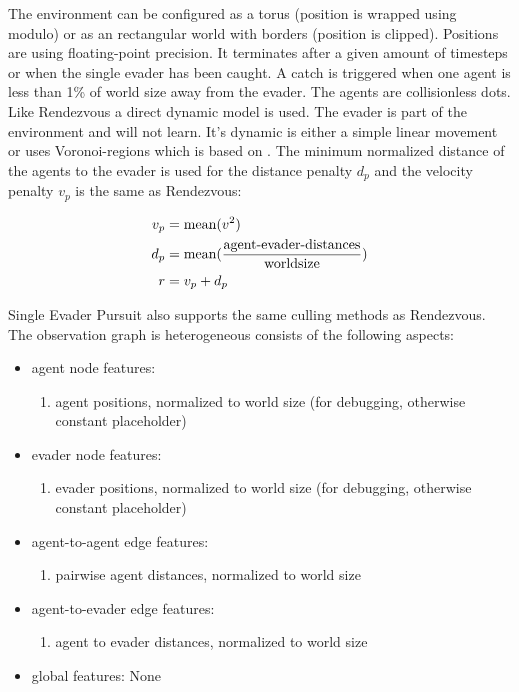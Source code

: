 The environment can be configured as a torus (position is wrapped using modulo) or as an rectangular world with borders (position is clipped). Positions are using floating-point precision. It terminates after a given amount of timesteps or when the single evader has been caught. A catch is triggered when one agent is less than 1\% of world size away from the evader.
The agents are collisionless dots. Like Rendezvous a direct dynamic model is used. The evader is part of the environment and will not learn. It's dynamic is either a simple linear movement or uses Voronoi-regions which is based on \citet{ZHOU201664}.
The minimum normalized distance of the agents to the evader is used for the distance penalty $d_p$ and the velocity penalty $v_p$ is the same as Rendezvous:

\begin{equation}
    \begin{aligned}
        v_p &= \textup{mean}(v^2)\\
        d_p &= \textup{mean}(\frac{\textup{agent-evader-distances}}{\textup{worldsize}}) \\
        r &= v_p + d_p
    \end{aligned}
    \nonumber
\end{equation}

Single Evader Pursuit also supports the same culling methods as Rendezvous. The observation graph is heterogeneous consists of the following aspects:
\begin{itemize}[noitemsep,nolistsep]
    \item agent node features:
    \begin{enumerate}
        \item agent positions, normalized to world size  (for debugging, otherwise constant placeholder)
    \end{enumerate} 
    \item evader node features:
    \begin{enumerate}
        \item evader positions, normalized to world size  (for debugging, otherwise constant placeholder)
    \end{enumerate}
    \item agent-to-agent edge features:
    \begin{enumerate}
        \item pairwise agent distances, normalized to world size
    \end{enumerate} 
    \item agent-to-evader edge features:
    \begin{enumerate}
        \item agent to evader distances, normalized to world size
    \end{enumerate} 
    \item global features: None
\end{itemize}



